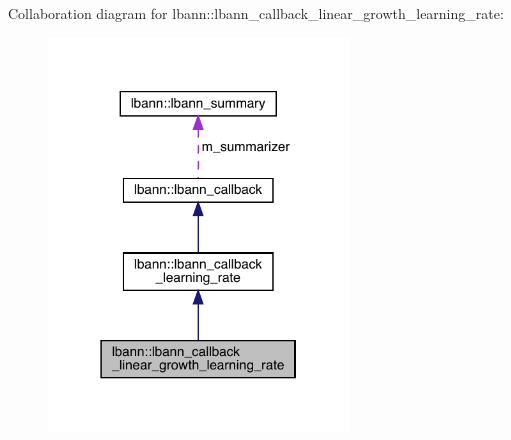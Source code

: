 Collaboration diagram for lbann\+:\+:lbann\+\_\+callback\+\_\+linear\+\_\+growth\+\_\+learning\+\_\+rate\+:\nopagebreak
\begin{figure}[H]
\begin{center}
\leavevmode
\includegraphics[width=226pt]{classlbann_1_1lbann__callback__linear__growth__learning__rate__coll__graph}
\end{center}
\end{figure}
